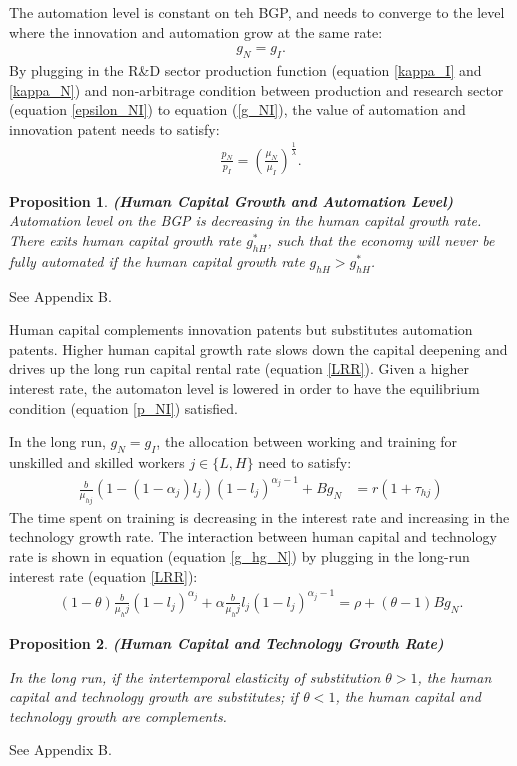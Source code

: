 \documentclass[12pt]{article}
\newtheorem{proposition}{Proposition}
\begin{document}
The automation level is constant on teh BGP, and needs to converge to the level where the innovation and automation grow at the same rate: 
\begin{align}
\label{g_NI}
g_N = g_I. 
\end{align}
By plugging in the R\&D sector production function (equation \ref{kappa_I} and \ref{kappa_N}) and non-arbitrage condition between production and research sector (equation \ref{epsilon_NI}) to equation (\ref{g_NI}), the value of automation and innovation patent needs to satisfy:
\begin{align}
\label{p_NI}
\frac{p_N}{p_I} = (\frac{\mu_N}{\mu_I})^{\frac{1}{\lambda}}.
\end{align}
\begin{proposition}{\bf (Human Capital Growth and Automation Level)} \\

Automation level on the BGP is decreasing in the human capital growth rate. There exits human capital growth rate $g_{hH}^*$, such that the economy will never be fully automated if the human capital growth rate $g_{hH}>g_{hH}^*$. 
\end{proposition}
 See Appendix B.

Human capital complements innovation patents but substitutes automation patents. Higher human capital growth rate slows down the capital deepening and drives up the long run capital rental rate (equation \ref{LRR}). Given a higher interest rate, the automaton level is lowered in order to have the equilibrium condition (equation \ref{p_NI}) satisfied.

In the long run, $g_N = g_I$, the allocation between working and training for unskilled and skilled workers $j\in\{L,H\}$ need to satisfy:
\begin{align*}
\frac{b}{\mu_{hj}}(1-(1-\alpha_j)l_j)(1-l_j)^{\alpha_j-1}+Bg_N&= r(1+\tau_{hj}) 
\end{align*}
The time spent on training is decreasing in the interest rate and increasing in the technology growth rate. The interaction between human capital and technology rate is shown in equation (equation \ref{g_hg_N}) by plugging in the long-run interest rate (equation \ref{LRR}):
\begin{align} 
\label{g_hg_N}
(1-\theta)\frac{b}{\mu_hj}(1-l_j)^{\alpha_j}+\alpha\frac{b}{\mu_hj}l_j(1-l_j)^{\alpha_j-1} = \rho+(\theta-1)Bg_N.
\end{align}

\begin{proposition}{\bf (Human Capital and Technology Growth Rate)}

In the long run, if the intertemporal elasticity of substitution $\theta>1$, the human capital and technology growth are substitutes; if $\theta<1$, the human capital and technology growth are complements.
\end{proposition}
 See Appendix B.
\end{document}
